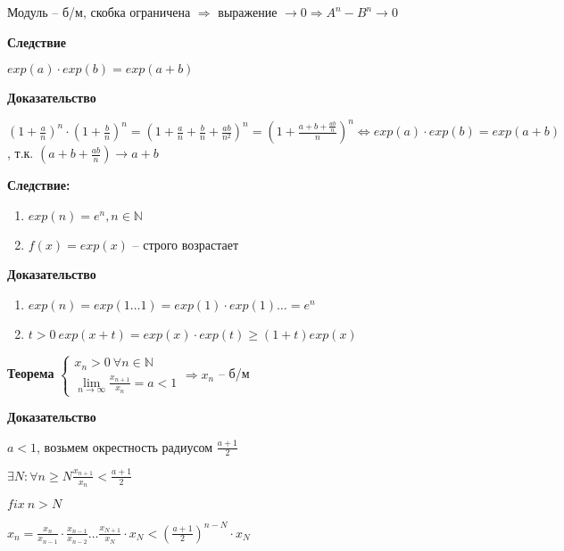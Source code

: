 \documentclass[14pt, letter paper]{article}
\begin{document}
Модуль -- б/м, скобка ограничена $\Rightarrow$ выражение $\rightarrow 0 \Rightarrow A^n - B^n \rightarrow 0$

\textbf{Следствие}

$exp(a) \cdot exp(b) = exp(a + b)$

\begin{center}
    \textbf{Доказательство}
\end{center}

$(1 + \frac{a}{n})^n \cdot ( 1 + \frac{b}{n})^n = ( 1 + \frac{a}{n} + \frac{b}{n} + \frac{ab}{n^2})^n = ( 1 + \frac{a + b + \frac{ab}{n}}{n})^n \Leftrightarrow exp(a) \cdot exp(b) = exp(a + b)$, т.к. $(a + b + \frac{ab}{n}) \rightarrow a + b$

\textbf{Следствие:}

\begin{enumerate}
    \item $exp(n) = e^n, n \in \mathds{N}$
    \item $f(x) = exp(x)$ -- строго возрастает
\end{enumerate}

\begin{center}
    \textbf{Доказательство}
\end{center}

\begin{enumerate}
    \item $exp(n) = exp(1\ldots1) = exp(1) \cdot exp(1) \ldots = e^n$
    \item $t > 0\ exp(x+t) = exp(x) \cdot exp(t) \geq (1 + t)exp(x)$
\end{enumerate}

\textbf{Теорема} $\begin{cases}
    x_n > 0\ \forall n \in \mathds{N} \\
    \lim\limits_{n \rightarrow \infty}{\frac{x_{n+1}}{x_n}} = a < 1
\end{cases} \Rightarrow x_n$ -- б/м

\begin{center}
    \textbf{Доказательство}
\end{center}

$a < 1$, возьмем окрестность радиусом $\frac{a+1}{2}$

$\exists N : \forall n \geq N \frac{x_{n+1}}{x_n} < \frac{a+1}{2}$

$fix\ n > N$

$x_n = \frac{x_n}{x_{n-1}} \cdot \frac{x_{n-1}}{x_{n-2}} \ldots \frac{x_{N+1}}{x_N} \cdot x_N < (\frac{a+1}{2})^{n-N}\cdot x_N$
\end{document}
